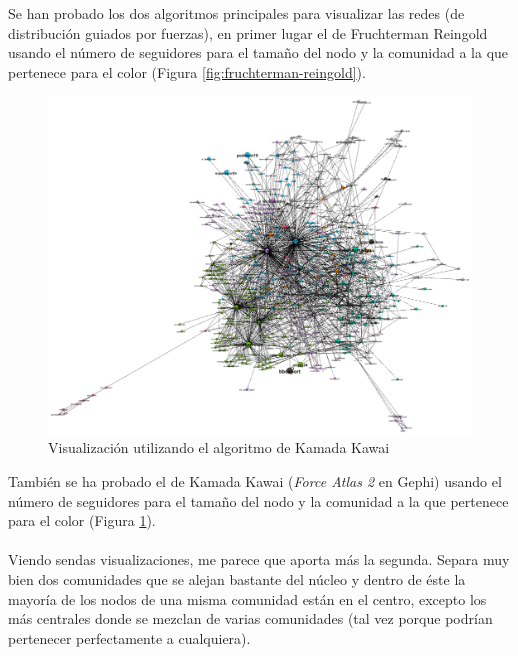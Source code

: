 Se han probado los dos algoritmos principales para visualizar las redes (de distribución guiados por fuerzas), en primer lugar el de Fruchterman Reingold usando el número de seguidores para el tamaño del nodo y la comunidad a la que pertenece para el color (Figura \ref{fig:fruchterman-reingold}).
	
\begin{figure}[H]
	\centering
	\includegraphics[width=14cm]{img/kamada-kawai}
	\caption{Visualización utilizando el algoritmo de Kamada Kawai}
	\label{fig:kamada-kawai}
\end{figure}

También se ha probado el de Kamada Kawai (\textit{Force Atlas 2} en Gephi) usando el número de seguidores para el tamaño del nodo y la comunidad a la que pertenece para el color (Figura \ref{fig:kamada-kawai}).
\\ \\
Viendo sendas visualizaciones, me parece que aporta más la segunda. Separa muy bien dos comunidades que se alejan bastante del núcleo y dentro de éste la mayoría de los nodos de una misma comunidad están en el centro, excepto los más centrales donde se mezclan de varias comunidades (tal vez porque podrían pertenecer perfectamente a cualquiera).

